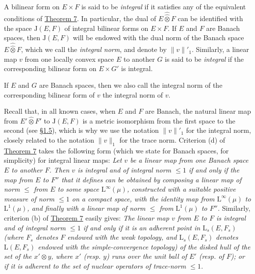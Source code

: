 \documentclass[british]{article}
\newcommand{\oldpage}[1]{\marginpar{\footnotesize$\Big\vert$ \textit{p.~#1}}}
\begin{document}
\oldpage{88}

A bilinear form on \(E\times F\) is said to be \emph{integral} if it
satisfies any of the equivalent conditions of
\hyperref[section-1-theorem-7]{Theorem 7}. In particular, the dual of
\(E\hat{\hat{\otimes}}F\) can be identified with the space
\(\mathrm{J}(E,F)\) of integral bilinear forms on \(E\times F\). If
\(E\) and \(F\) are Banach spaces, then \(\mathrm{J}(E,F)\) will be
endowed with the dual norm of the Banach space
\(E\hat{\hat{\otimes}}F\), which we call the \emph{integral norm}, and
denote by \(\|v\|'_1\). Similarly, a linear map \(v\) from one locally
convex space \(E\) to another \(G\) is said to be \emph{integral} if the
corresponding bilinear form on \(E\times G'\) is integral.

If \(E\) and \(G\) are Banach spaces, then we also call the integral
norm of the corresponding bilinear form of \(v\) the integral norm of
\(v\).

Recall that, in all known cases, when \(E\) and \(F\) are Banach, the
natural linear map from \(E'\hat{\otimes}F'\) to \(\mathrm{J}(E,F)\) is
a metric isomorphism from the first space to the second (see
\hyperref[section-1.5]{§1.5}), which is why we use the notation
\(\|v\|'_1\) for the integral norm, closely related to the notation
\(\|v\|_1\) for the trace norm. Criterion (d) of
\hyperref[section-1-theorem-7]{Theorem 7} takes the following form
(which we state for Banach spaces, for simplicity) for integral linear
maps: \emph{Let \(v\) be a linear map from one Banach space \(E\) to
another \(F\). Then \(v\) is integral and of integral norm
\(\leqslant 1\) if and only if the map from \(E\) to \(F''\) that it
defines can be obtained by composing a linear map of norm \(\leqslant\)
from \(E\) to some space \(\mathrm{L}^\infty(\mu)\), constructed with a
suitable positive measure of norm \(\leqslant 1\) on a compact space,
with the identity map from \(\mathrm{L}^\infty(\mu)\) to
\(\mathrm{L}^1(\mu)\), and finally with a linear map of norm
\(\leqslant\) from \(\mathrm{L}^1(\mu)\) to \(F''\).} Similarly,
criterion (b) of \hyperref[section-1-theorem-7]{Theorem 7} easily gives:
\emph{The linear map \(v\) from \(E\) to \(F\) is integral and of
integral norm \(\leqslant 1\) if and only if it is an adherent point in
\(\mathrm{L}_s(E,F_s)\) (where \(F_s\) denotes \(F\) endowed with the
weak topology, and \(\mathrm{L}_s(E,F_s)\) denotes \(\mathrm{L}(E,F_s)\)
endowed with the simple-convergence topology) of the disked hull of the
set of the \(x'\otimes y\), where \(x'\) (resp. \(y\)) runs over the
unit ball of \(E'\) (resp. of \(F\)); or if it is adherent to the set of
nuclear operators of trace-norm \(\leqslant 1\).}
\end{document}
